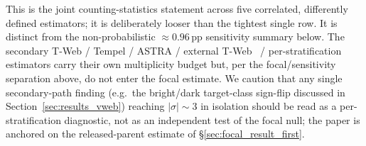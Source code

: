 \documentclass[aps,prd,twocolumn,superscriptaddress,showpacs,preprintnumbers,nofootinbib,longbibliography,floatfix]{revtex4-2}
\begin{document}
This is the joint counting-statistics statement across five correlated,
differently defined estimators; it is deliberately looser than the
tightest single row. It is distinct from the non-probabilistic
${\approx}0.96$\,pp sensitivity summary below. The secondary T-Web / Tempel / ASTRA
/ external T-Web~\cite{TWebDESI2026} / per-stratification estimators carry their own multiplicity
budget but, per the focal/sensitivity separation above, do not enter
the focal estimate. We caution that any single secondary-path
finding (e.g.\ the bright/dark target-class sign-flip discussed in
Section~\ref{sec:results_vweb}) reaching $|\sigma| \sim 3$ in
isolation should be read as a per-stratification diagnostic, not as
an independent test of the focal null; the paper is anchored on the
released-parent estimate of \S\ref{sec:focal_result_first}.
\end{document}
